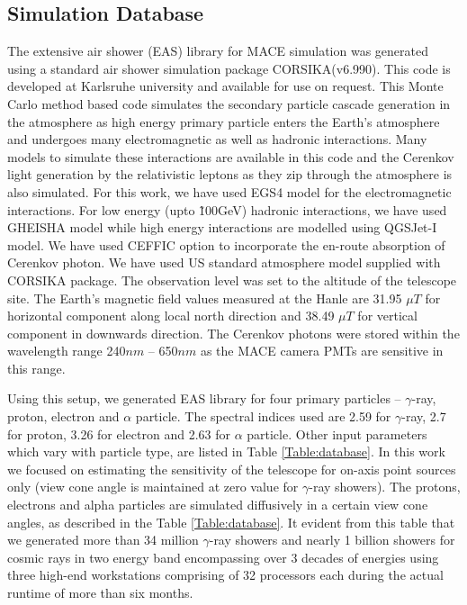 \documentclass[preprint,12pt]{elsarticle}
\begin{document}
\subsection{Simulation Database}
The extensive air shower (EAS) library for MACE simulation was generated using a standard air shower simulation
package CORSIKA(v6.990). This code is developed at Karlsruhe university and available for use on request. This Monte
Carlo method based code simulates the secondary particle cascade generation in the atmosphere as high energy primary
particle enters the Earth's atmosphere and undergoes many electromagnetic as well as hadronic interactions. Many models
to simulate these interactions are available in this code and the Cerenkov light generation by the relativistic 
leptons as they zip through the atmosphere is also simulated. For this work, we have used EGS4 model for the electromagnetic 
interactions. For low energy (upto \~100GeV) hadronic interactions, we have used GHEISHA model while high energy interactions
are modelled using QGSJet-I model. We have used CEFFIC option to incorporate the en-route absorption of Cerenkov photon. 
We have used US standard atmosphere model supplied with CORSIKA package. The observation level was set to the altitude of 
the telescope site. The Earth's magnetic field values measured at the Hanle 
are 31.95 $\mu T$ for horizontal component along local north direction and 38.49 $\mu T$ for vertical 
component in downwards direction. The Cerenkov photons were stored within the wavelength range 240$nm$ -- 650$nm$ as
the MACE camera PMTs are sensitive in this range. 

Using this setup, we generated EAS library for four primary particles -- $\gamma$-ray, proton, electron and $\alpha$ particle.
The spectral indices used are 2.59 \cite{crabHEGRA} for $\gamma$-ray, 2.7 for proton, 3.26 for electron and 2.63 for $\alpha$ particle.
Other input parameters which vary with particle type, are listed in Table \ref{Table:database}. In this work we focused on
estimating the sensitivity of the telescope for on-axis point sources only (view cone angle is maintained at zero value
for $\gamma$-ray showers). The protons, electrons and alpha particles are simulated diffusively in a certain view cone angles, as 
described in the Table \ref{Table:database}.   %
It evident from this table that we generated more than 34 million $\gamma$-ray 
showers and nearly 1 billion showers for cosmic rays in two energy band encompassing over 3 decades of energies using
three high-end workstations comprising of 32 processors each during the actual runtime of more than six months.
\end{document}
